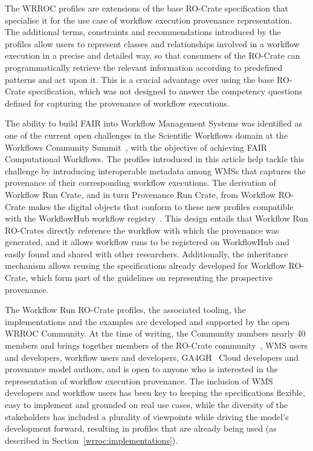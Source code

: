The WRROC profiles are extensions of the base RO-Crate specification that specialise it for the use case of workflow execution provenance representation. The additional terms, constraints and recommendations introduced by the profiles allow users to represent classes and relationships involved in a workflow execution in a precise and detailed way, so that consumers of the RO-Crate can programmatically retrieve the relevant information according to predefined patterns and act upon it. This is a crucial advantage over using the base RO-Crate specification, which was not designed to answer the competency questions defined for capturing the provenance of workflow executions.

The ability to build FAIR into Workflow Management Systems was identified as one of the current open challenges in the Scientific Workflows domain at
the Workflows Community Summit~\cite{Ferreira 2023}, with the objective of achieving FAIR Computational Workflows. The profiles introduced in this article help tackle this challenge by introducing interoperable metadata among WMSs that captures the provenance of their corresponding workflow executions.
%
The derivation of Workflow Run Crate, and in turn Provenance Run Crate, from Workflow RO-Crate makes the digital objects that conform to these new profiles compatible with the WorkflowHub workflow registry~\cite{Goble 2021}. This design entails that Workflow Run RO-Crates directly reference the workflow with which the provenance was generated, and it allows workflow runs to be registered on WorkflowHub and easily found and shared with other researchers. Additionally, the inheritance mechanism allows reusing the specifications already developed for Workflow RO-Crate, which form part of the guidelines on representing the prospective provenance.

The Workflow Run RO-Crate profiles, the associated tooling, the implementations and the examples are developed and supported by the open WRROC Community.
At the time of writing, the Community numbers nearly 40 members and brings together members of the RO-Crate community~\cite{Soiland-Reyes 2022a}, WMS users and developers, workflow users and developers, GA4GH~\cite{Rehm 2021} Cloud developers and provenance model authors, and is open to anyone who is interested in the representation of workflow execution provenance.
The inclusion of WMS developers and workflow users has been key to keeping the specifications flexible, easy to implement and grounded on real use cases, while the diversity of the stakeholders has included a plurality of viewpoints while driving the model's development forward, resulting in profiles that are already being used (as described in Section~\ref{wrroc:implementations}).

